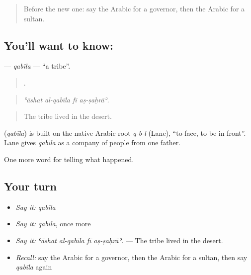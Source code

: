 \label{lesson:AR-C340-qabila}



\begin{quote}
Before the new one: say the Arabic for a governor, then the Arabic for a sultan.
\end{quote}

\subsection*{You'll want to know: }
\textbf{} — \emph{qabīla} — \textquotedblleft{}a tribe\textquotedblright{}.

\begin{quote}
   .
\end{quote}

\begin{quote}
\emph{ʿāshat al-qabīla fī aṣ-ṣaḥrāʾ.}
\end{quote}

\begin{quote}
The tribe lived in the desert.
\end{quote}

\begin{cousinweb}
\textbf{} (\emph{qabīla}) is built on the native Arabic root \emph{q-b-l} (Lane), \textquotedblleft{}to face, to be in front\textquotedblright{}. Lane gives \emph{qabīla} as a company of people from one father.
\end{cousinweb}

\begin{grammarlens}[title={What you've built}]
One more word for telling what happened.
\end{grammarlens}

\subsection*{Your turn}
\begin{itemize}
\raggedright
  \item \emph{Say it:} \emph{qabīla}
  \item \emph{Say it:} \emph{qabīla}, once more
  \item \emph{Say it:} \emph{ʿāshat al-qabīla fī aṣ-ṣaḥrāʾ.} — The tribe lived in the desert.
  \item \emph{Recall:} say the Arabic for a governor, then the Arabic for a sultan, then say \emph{qabīla} again
\end{itemize}

